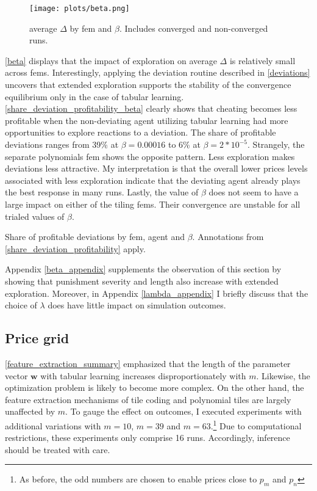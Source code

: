\begin{figure}
	\texttt{[image: plots/beta.png]}
	\caption[average $\Delta$ by \gls{fem} and $\beta$]{average $\Delta$ by \gls{fem} and $\beta$. Includes converged and non-converged runs.}
	\label{beta}
\end{figure}

\autoref{beta} displays that the impact of exploration on average $\Delta$ is relatively small across \gls{fem}s. Interestingly, applying the deviation routine described in \autoref{deviations} uncovers that extended exploration supports the stability of the convergence equilibrium only in the case of tabular learning. \autoref{share_deviation_profitability_beta} clearly shows that cheating becomes less profitable when the non-deviating agent utilizing tabular learning had more opportunities to explore reactions to a deviation. The share of profitable deviations ranges from 39\% at $\beta = 0.00016$ to 6\% at $\beta= 2*10^{-5}$. Strangely, the separate polynomials \gls{fem} shows the opposite pattern. Less exploration makes deviations less attractive. My interpretation is that the overall lower prices levels associated with less exploration indicate that the deviating agent already plays the best response in many runs. Lastly, the value of $\beta$ does not seem to have a large impact on either of the tiling \gls{fem}s. Their convergence are unstable for all trialed values of $\beta$.

\begin{table}
	\centering
	
	\caption[Share of profitable deviations by \gls{fem}, agent and $\beta$]{Share of profitable deviations by \gls{fem}, agent and $\beta$. Annotations from \autoref{share_deviation_profitability} apply.}
	\label{share_deviation_profitability_beta}
\end{table}

Appendix \ref{beta_appendix} supplements the observation of this section by showing that punishment severity and length also increase with extended exploration. Moreover, in Appendix \ref{lambda_appendix} I briefly discuss that the choice of $\lambda$ does have little impact on simulation outcomes.

\subsection{Price grid}

\autoref{feature_extraction_summary} emphasized that the length of the parameter vector $\boldsymbol{w}$ with tabular learning increases disproportionately with $m$. Likewise, the optimization problem is likely to become more complex. On the other hand, the feature extraction mechanisms of tile coding and polynomial tiles are largely unaffected by $m$. To gauge the effect on outcomes, I executed experiments with additional variations with $m=10$, $m = 39$ and $m = 63$.\footnote{As before, the odd numbers are chosen to enable prices close to $p_m$ and $p_n$} Due to computational restrictions, these experiments  only comprise 16 runs. Accordingly, inference should be treated with care.

